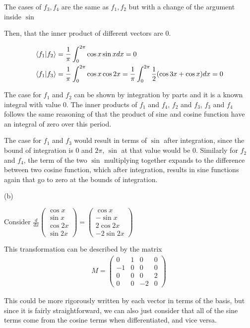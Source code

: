 \documentclass{article}
\begin{document}
The cases of $f_3, f_4$ are the same as $f_1, f_2$ but with a change of the argument inside $\sin$

Then, that the inner product of different vectors are 0.

\begin{align*}
&\bra{f_1}\ket{f_2} = \frac{1}{\pi} \int_{0}^{2\pi} \cos x \sin x dx = 0 \\
&\bra{f_1}\ket{f_3} = \frac{1}{\pi} \int_{0}^{2\pi} \cos x \cos 2x = \frac{1}{\pi} \int_{0}^{2\pi} \frac{1}{2}(\cos 3x + \cos x) dx = 0
\end{align*}

The case for $f_1$ and $f_2$ can be shown by integration by parts and it is a known integral with value 0. The inner products of $f_1$ and $f_4$, $f_2$ and $f_3$, $f_3$ and $f_4$ follows the same reasoning of that the product of sine and cosine function have an integral of zero over this period.

The case for $f_1$ and $f_3$ would result in terms of $\sin$ after integration, since the bound of integration is $0$ and $2 \pi$, $\sin$ at that value would be 0. Similarly for $f_2$ and $f_4$, the term of the two $\sin$ multiplying together expands to the difference between two cosine function, which after integration, results in sine functions again that go to zero at the bounds of integration.

(b)

Consider $\frac{d}{dx}\begin{pmatrix}
\cos x \\ \sin x \\ \cos 2x \\ \sin 2x
\end{pmatrix}
= \begin{pmatrix}
\cos x \\ -\sin x \\ 2\cos 2x \\ -2 \sin 2x
\end{pmatrix}$

This transformation can be described by the matrix 
\begin{align*}
M = \begin{pmatrix}
0 & 1 & 0 & 0 \\ -1 & 0 & 0 & 0 \\ 0 & 0 & 0 & 2 \\ 0 & 0 & -2 & 0 
\end{pmatrix}
\end{align*}

This could be more rigorously written by each vector in terms of the basis, but since it is fairly straightforward, we can also just consider that all of the sine terms come from the cosine terms when differentiated, and vice versa.
\end{document}
